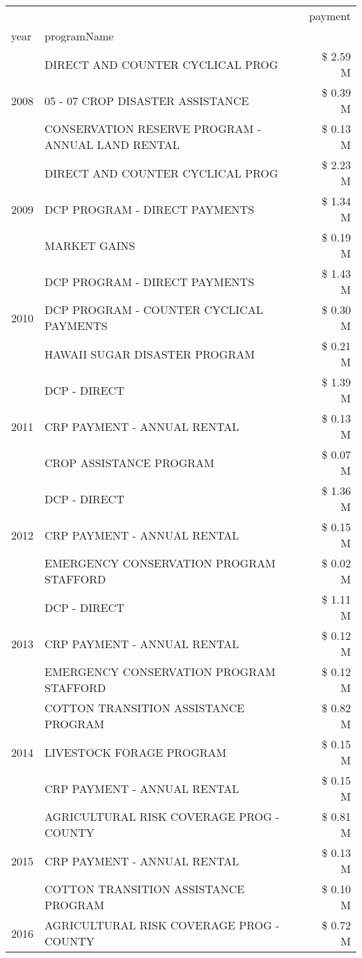 \begin{tabular}{llr}
\toprule
 &  & payment \\
year & programName &  \\
\midrule
\multirow[t]{3}{*}{2008} & DIRECT AND COUNTER CYCLICAL PROG & \$ 2.59 M \\
 & 05 - 07 CROP DISASTER ASSISTANCE & \$ 0.39 M \\
 & CONSERVATION RESERVE PROGRAM - ANNUAL LAND RENTAL & \$ 0.13 M \\
\cline{1-3}
\multirow[t]{3}{*}{2009} & DIRECT AND COUNTER CYCLICAL PROG & \$ 2.23 M \\
 & DCP PROGRAM - DIRECT PAYMENTS & \$ 1.34 M \\
 & MARKET GAINS & \$ 0.19 M \\
\cline{1-3}
\multirow[t]{3}{*}{2010} & DCP PROGRAM - DIRECT PAYMENTS & \$ 1.43 M \\
 & DCP PROGRAM - COUNTER CYCLICAL PAYMENTS & \$ 0.30 M \\
 & HAWAII SUGAR DISASTER PROGRAM & \$ 0.21 M \\
\cline{1-3}
\multirow[t]{3}{*}{2011} & DCP - DIRECT & \$ 1.39 M \\
 & CRP PAYMENT - ANNUAL RENTAL & \$ 0.13 M \\
 & CROP ASSISTANCE PROGRAM & \$ 0.07 M \\
\cline{1-3}
\multirow[t]{3}{*}{2012} & DCP - DIRECT & \$ 1.36 M \\
 & CRP PAYMENT - ANNUAL RENTAL & \$ 0.15 M \\
 & EMERGENCY CONSERVATION PROGRAM STAFFORD & \$ 0.02 M \\
\cline{1-3}
\multirow[t]{3}{*}{2013} & DCP - DIRECT & \$ 1.11 M \\
 & CRP PAYMENT - ANNUAL RENTAL & \$ 0.12 M \\
 & EMERGENCY CONSERVATION PROGRAM STAFFORD & \$ 0.12 M \\
\cline{1-3}
\multirow[t]{3}{*}{2014} & COTTON TRANSITION ASSISTANCE PROGRAM & \$ 0.82 M \\
 & LIVESTOCK FORAGE PROGRAM & \$ 0.15 M \\
 & CRP PAYMENT - ANNUAL RENTAL & \$ 0.15 M \\
\cline{1-3}
\multirow[t]{3}{*}{2015} & AGRICULTURAL RISK COVERAGE PROG - COUNTY & \$ 0.81 M \\
 & CRP PAYMENT - ANNUAL RENTAL & \$ 0.13 M \\
 & COTTON TRANSITION ASSISTANCE PROGRAM & \$ 0.10 M \\
\cline{1-3}
\multirow[t]{3}{*}{2016} & AGRICULTURAL RISK COVERAGE PROG - COUNTY & \$ 0.72 M \\

\end{tabular}
